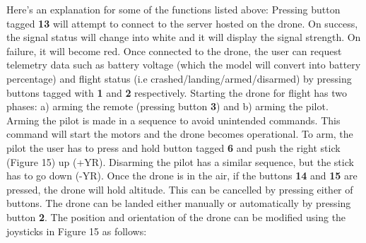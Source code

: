 \documentclass{IEEEtran}
\begin{document}
Here's an explanation for some of the functions listed above:
Pressing button tagged \textbf{13} will attempt to connect to the server hosted on the drone. On success, the signal status will change into white and it will display the signal strength. On failure, it will become red.
\newline
Once connected to the drone, the user can request telemetry data such as battery voltage (which the model will convert into battery percentage) and flight status (i.e crashed/landing/armed/disarmed) by pressing buttons tagged with \textbf{1} and \textbf{2} respectively.
\newline
\newline
Starting the drone for flight has two phases: a) arming the remote (pressing button \textbf{3}) and b) arming the pilot. Arming the pilot is made in a sequence to avoid unintended commands. This command will start the motors and the drone becomes operational. To arm, the pilot the user has to press and hold button tagged \textbf{6} and push the right stick (Figure 15) up (+YR). Disarming the pilot has a similar sequence, but the stick has to go down (-YR).
\newline
\newline
Once the drone is in the air, if the buttons \textbf{14} and \textbf{15} are pressed, the drone will hold altitude. This can be cancelled by pressing either of buttons. The drone can be landed either manually or automatically by pressing button \textbf{2}.
\newline
\newline
The position and orientation of the drone can be modified using the joysticks in Figure 15 as follows:
\end{document}
